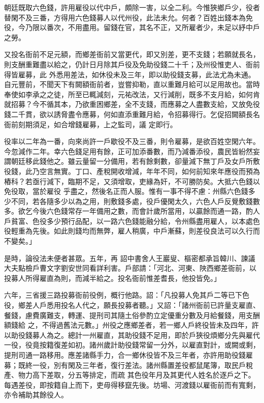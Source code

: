 \begin{pinyinscope}
 朝廷既取六色錢，許用雇役以代中戶，頗除一害，以全二利。今惟狹鄉戶少，役者替閑不及三番，方得用六色錢募人以代州役，此法未允。何者？百姓出錢本為免役，今乃限以番次，不用盡用。留錢在官，其名不正，又所雇者少，未足以紓中戶之勞。



 又投名衙前不足元額，而鄉差衙前又當更代，即又別差，更不支錢；若願就長名，則支酬重難盡以給之，仍計日月除其戶役及免助役錢二十千；及州役惟吏人、衙前得皆雇募，此
 外悉用差法，如休役未及三年，即以助役錢支募，此法尤為未通。自元豐前，不聞天下有闕額衙前者，豈嘗抑勒，直以重難月給可以足用故也。當時奉使如李承之之徒，所至已輒減刻，元祐改法，又行減削，既多不支月給，如何肯就招募？今不循其本，乃欲重困鄉差，全不支錢，而應募之人盡數支給，又放免役錢二千貫，欲以誘脅盡令應募，何如直添重難月給，令招募得行。乞促招闕額長名衙前刻期須足，如合增錢雇募，上之監司，議
 定即行。



 役率以二年為一番，向來尚許一戶歇役不及三番，則令雇募，是欲百姓空閑六年。今忽減作二年。幸六色錢足用有餘，正可加添番數，而乃減番添役，農民皆紛然妄謂朝廷移此錢他之。雖云量留一分備用，若有餘剩數，卻量減下無丁戶及女戶所敷役錢，此乃空言無實。丁口、產稅開收增減，年年不同，如何前知來年應役而預為樁科？若亟行減下，臨期不足，又須增取，吏緣為奸，不可勝防矣。大抵六色錢以免役取，當於雇役
 乎盡之，然後名正而人服。惟有一事不得不慮：州縣六色錢多少不同，若各隨多少以為之用，則敷錢多處，役戶優閑太久，六色人戶反覺敷錢數多。欲乞今後六色錢常存一年備用之數，而會計歲所當用，以贏餘而通一路，酌人戶貧富、色役多少預行品配，以一路六色錢能融分給，令州縣盡用雇人，以本處色役輕重為先後。如此則錢均而無弊，雇人稍廣，中戶漸蘇，則差役良法可以久行而不變矣。」



 是時，論役法未便者甚眾。五年，再
 詔中書舍人王巖叟、樞密都承旨韓川、諫議大夫點檢戶曹文字劉安世同看詳利害。戶部請：「河北、河東、陜西鄉差衙前，以投募人所得雇直為則，而減半給之。投名衙前惟差耆長，他投皆免。」



 六年，三省援三路投募衙前役例，概行他路。詔：「凡投募人免其戶二等已下色役，鄉差人戶悉用投名人代之，願長投募者聽。」又詔：「諸州衙前已許量支雇直、餐錢，慮費廣難支，轉運、提刑司其隨土俗參酌立定優重分數及月給餐錢，用支酬額錢給
 之，不得過舊法元數。」州役之應鄉差者，若一鄉人戶終役皆未及四年，許以助役錢募人為之。總計一州雇直，其助役錢不足用，即於戶狹役煩鄉分先與雇代一役，役竟按籍復差如初。諸州歲計助役錢常留一分外，以雇直對計，或闕或剩，提刑司通一路移用。應差諸縣手力，合一鄉休役皆不及三年者，亦許用助役錢雇募；既終一役，別有閑及三年者，復行差法。諸州縣置差役都鼠尾簿，取民戶稅產、物力高下差取，分五等排定，而疏
 其色役年月及其更代人姓名於逐戶之下。每遇差役，即按籍自上而下，吏毋得移竄先後。坊場、河渡錢以雇衙前而有寬剩，亦令補助其餘役人。




\end{pinyinscope}
